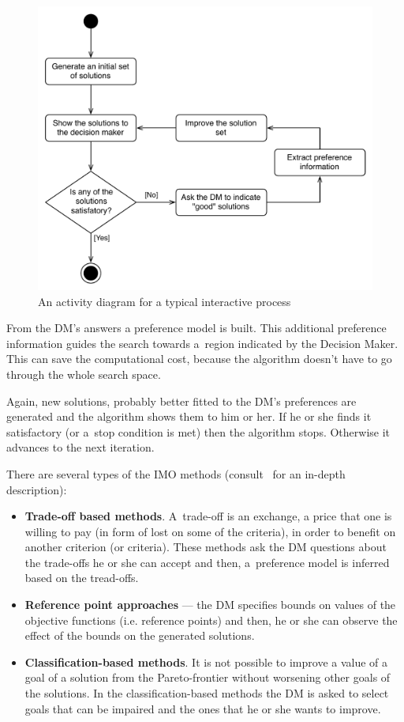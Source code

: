 \begin{figure}
  \centering \includegraphics[scale=0.65]{img/imoprocess_uml}
  \caption{An activity diagram for a typical interactive process}
  \label{imoprocess_uml}
\end{figure}

From the DM's answers a preference model is built. This additional preference
information guides the search towards a~region indicated by the Decision
Maker. This can save the computational cost, because the algorithm doesn't
have to go through the whole search space.

Again, new solutions, probably better fitted to the DM's preferences are
generated and the algorithm shows them to him or her. If he or she finds it
satisfactory (or a~stop condition is met) then the algorithm stops. Otherwise
it advances to the next iteration.

There are several types of the IMO methods (consult~\cite{MRW08} for an
in-depth description):
\begin{itemize}
\item \textbf{Trade-off based methods}. A~trade-off is an exchange, a price that
  one is willing to pay (in form of lost on some of the criteria), in order to
  benefit on another criterion (or criteria). These methods ask the DM
  questions about the trade-offs he or she can accept and then, a~preference
  model is inferred based on the tread-offs.
\item \textbf{Reference point approaches} --- the DM specifies bounds on
  values of the objective functions (i.e. reference points) and then, he or
  she can observe the effect of the bounds on the generated solutions.
\item \textbf{Classification-based methods}. It is not possible to improve a
  value of a goal of a solution from the Pareto-frontier without worsening
  other goals of the solutions. In the classification-based methods the DM is
  asked to select goals that can be impaired and the ones that he or she wants
  to improve.
\end{itemize}

